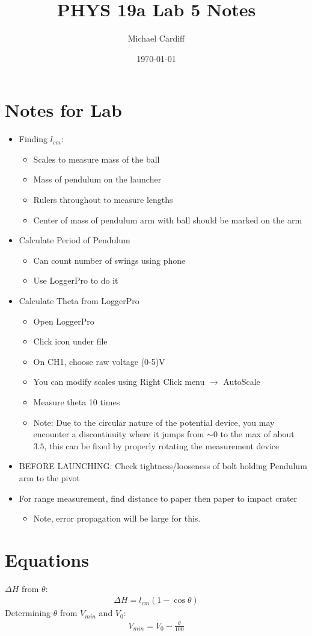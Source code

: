 \documentclass[12pt]{article}
\title{\vspace{-3em}PHYS 19a Lab 5 Notes}
\author{Michael Cardiff}
\date{\today}
\begin{document}
\maketitle

\section{Notes for Lab}
\begin{itemize}
\item Finding $l_{cm}$:
  \begin{itemize}
  \item Scales to measure mass of the ball
  \item Mass of pendulum on the launcher
  \item Rulers throughout to measure lengths
  \item Center of mass of pendulum arm with ball should be marked on the arm
  \end{itemize}
\item Calculate Period of Pendulum
  \begin{itemize}
  \item Can count number of swings using phone
  \item Use LoggerPro to do it
  \end{itemize}
\item Calculate Theta from LoggerPro
  \begin{itemize}
  \item Open LoggerPro
  \item Click icon under file
  \item On CH1, choose raw voltage (0-5)V
  \item You can modify scales using Right Click menu $\to$ AutoScale
  \item Measure theta 10 times
  \item Note: Due to the circular nature of the potential device, you may encounter a discontinuity where it jumps from $\sim0$ to the max of about $3.5$, this can be fixed by properly rotating the measurement device
  \end{itemize}
\item BEFORE LAUNCHING: Check tightness/looseness of bolt holding Pendulum arm to the pivot
\item For range measurement, find distance to paper then paper to impact crater
  \begin{itemize}
  \item Note, error propagation will be large for this.
  \end{itemize}
\end{itemize}
\section{Equations}
$\Delta H$ from $\theta$:
\begin{align*}
  \Delta H= l_{cm}(1-\cos\theta)
\end{align*}
Determining $\theta$ from $V_{min}$ and $V_0$:
\begin{align*}
  V_{min}=V_0-\frac\theta{100}
\end{align*}
\end{document}
